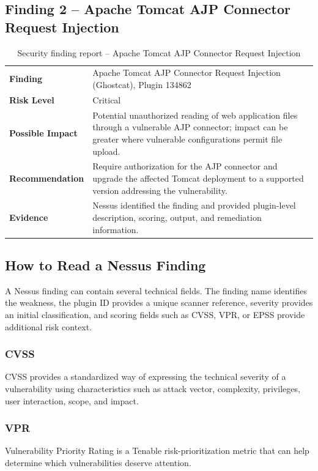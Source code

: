 \documentclass[11pt,a4paper]{article}
\begin{document}
\subsection{Finding 2 – Apache Tomcat AJP Connector Request Injection}
\begin{table}[H]\centering
\begin{tabularx}{\textwidth}{>{\bfseries}p{3.0cm}X}
\toprule
Finding & Apache Tomcat AJP Connector Request Injection (Ghostcat), Plugin 134862\\
Risk Level & Critical\\
Possible Impact & Potential unauthorized reading of web application files through a vulnerable AJP connector; impact can be greater where vulnerable configurations permit file upload.\\
Recommendation & Require authorization for the AJP connector and upgrade the affected Tomcat deployment to a supported version addressing the vulnerability.\\
Evidence & Nessus identified the finding and provided plugin-level description, scoring, output, and remediation information.\\
\bottomrule
\end{tabularx}
\caption{Security finding report – Apache Tomcat AJP Connector Request Injection}
\end{table}


\subsection{How to Read a Nessus Finding}
A Nessus finding can contain several technical fields. The finding name identifies the weakness, the plugin ID provides a unique scanner reference, severity provides an initial classification, and scoring fields such as CVSS, VPR, or EPSS provide additional risk context.

\subsubsection{CVSS}
CVSS provides a standardized way of expressing the technical severity of a vulnerability using characteristics such as attack vector, complexity, privileges, user interaction, scope, and impact.

\subsubsection{VPR}
Vulnerability Priority Rating is a Tenable risk-prioritization metric that can help determine which vulnerabilities deserve attention.
\end{document}
